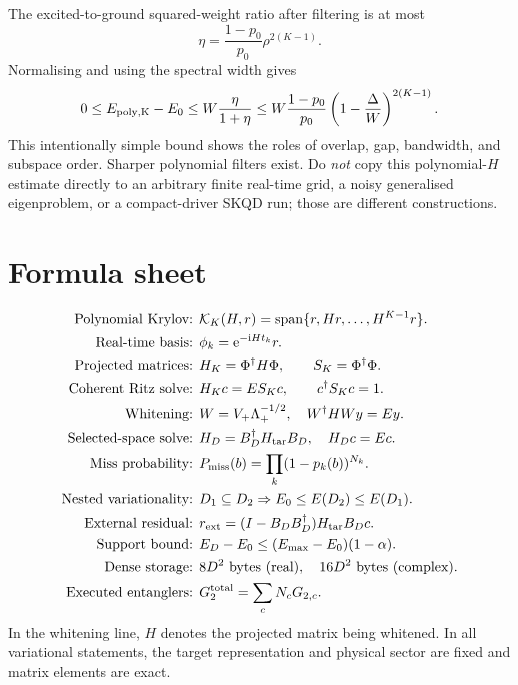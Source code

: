 \documentclass[11pt,a4paper,oneside]{report}
\newcommand{\I}{\mathrm i}
\newcommand{\e}{\mathrm e}
\begin{document}
The excited-to-ground squared-weight ratio after filtering is at most
\begin{equation}
\eta=\frac{1-p_0}{p_0}\rho^{2(K-1)}.
\end{equation}
Normalising and using the spectral width gives
\begin{equation}
0\le E_{\rm poly,K}-E_0\le W\frac{\eta}{1+\eta}\le W\frac{1-p_0}{p_0}\left(1-\frac\Delta W\right)^{2(K-1)}.
\end{equation}
This intentionally simple bound shows the roles of overlap, gap, bandwidth, and subspace order. Sharper polynomial filters exist. Do \emph{not} copy this polynomial-$H$ estimate directly to an arbitrary finite real-time grid, a noisy generalised eigenproblem, or a compact-driver SKQD run; those are different constructions.

\section{Formula sheet}
\begin{align*}
\text{Polynomial Krylov: }&\mathcal K_K(H,r)=\operatorname{span}\{r,Hr,\ldots,H^{K-1}r\}.\\
\text{Real-time basis: }&\phi_k=\e^{-\I Ht_k}r.\\
\text{Projected matrices: }&H_K=\Phi^\dagger H\Phi,\qquad S_K=\Phi^\dagger\Phi.\\
\text{Coherent Ritz solve: }&H_Kc=ES_Kc,\qquad c^\dagger S_Kc=1.\\
\text{Whitening: }&W=V_+\Lambda_+^{-1/2},\quad W^\dagger HWy=Ey.\\
\text{Selected-space solve: }&H_D=B_D^\dagger H_{\rm tar}B_D,\quad H_Dc=Ec.\\
\text{Miss probability: }&P_{\rm miss}(b)=\prod_k(1-p_k(b))^{N_k}.\\
\text{Nested variationality: }&D_1\subseteq D_2\Rightarrow E_0\le E(D_2)\le E(D_1).\\
\text{External residual: }&r_{\rm ext}=(I-B_DB_D^\dagger)H_{\rm tar}B_Dc.\\
\text{Support bound: }&E_D-E_0\le(E_{\max}-E_0)(1-\alpha).\\
\text{Dense storage: }&8D^2\text{ bytes (real)},\quad16D^2\text{ bytes (complex)}.\\
\text{Executed entanglers: }&G_2^{\rm total}=\sum_cN_cG_{2,c}.
\end{align*}
In the whitening line, $H$ denotes the projected matrix being whitened. In all variational statements, the target representation and physical sector are fixed and matrix elements are exact.
\end{document}
